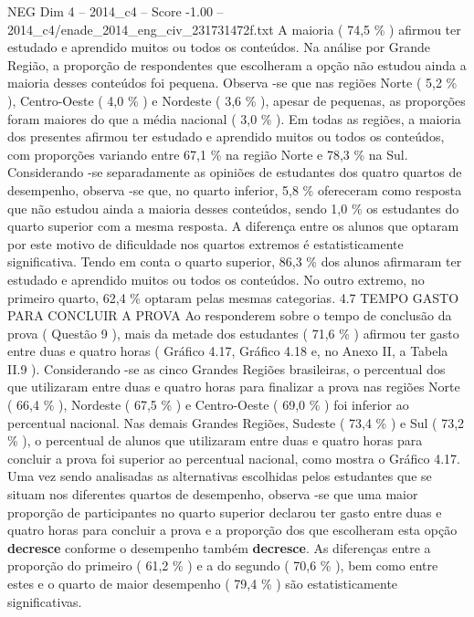 \begin{textsample}{NEG Dim 4 – 2014\_c4 – Score -1.00 – 2014\_c4/enade\_2014\_eng\_civ\_231731472f.txt}
A maioria ( 74,5 \% ) afirmou ter estudado e aprendido muitos ou todos os conteúdos.
Na análise por Grande Região, a proporção de respondentes que escolheram a opção não estudou ainda a maioria desses conteúdos foi pequena.
Observa -se que nas regiões Norte ( 5,2 \% ), Centro-Oeste ( 4,0 \% ) e Nordeste ( 3,6 \% ), apesar de pequenas, as proporções foram maiores do que a média nacional ( 3,0 \% ).
Em todas as regiões, a maioria dos presentes afirmou ter estudado e aprendido muitos ou todos os conteúdos, com proporções variando entre 67,1 \% na região Norte e 78,3 \% na Sul.
Considerando -se separadamente as opiniões de estudantes dos quatro quartos de desempenho, observa -se que, no quarto inferior, 5,8 \% ofereceram como resposta que não estudou ainda a maioria desses conteúdos, sendo 1,0 \% os estudantes do quarto superior com a mesma resposta.
A diferença entre os alunos que optaram por este motivo de dificuldade nos quartos extremos é estatisticamente significativa.
Tendo em conta o quarto superior, 86,3 \% dos alunos afirmaram ter estudado e aprendido muitos ou todos os conteúdos.
No outro extremo, no primeiro quarto, 62,4 \% optaram pelas mesmas categorias. 4.7 TEMPO GASTO PARA CONCLUIR A PROVA Ao responderem sobre o tempo de conclusão da prova ( Questão 9 ), mais da metade dos estudantes ( 71,6 \% ) afirmou ter gasto entre duas e quatro horas ( Gráfico 4.17, Gráfico 4.18 e, no Anexo II, a Tabela II.9 ).
Considerando -se as cinco Grandes Regiões brasileiras, o percentual dos que utilizaram entre duas e quatro horas para finalizar a prova nas regiões Norte ( 66,4 \% ), Nordeste ( 67,5 \% ) e Centro-Oeste ( 69,0 \% ) foi inferior ao percentual nacional.
Nas demais Grandes Regiões, Sudeste ( 73,4 \% ) e Sul ( 73,2 \% ), o percentual de alunos que utilizaram entre duas e quatro horas para concluir a prova foi superior ao percentual nacional, como mostra o Gráfico 4.17.
Uma vez sendo analisadas as alternativas escolhidas pelos estudantes que se situam nos diferentes quartos de desempenho, observa -se que uma maior proporção de participantes no quarto superior declarou ter gasto entre duas e quatro horas para concluir a prova e a proporção dos que escolheram esta opção \textbf{decresce} conforme o desempenho também \textbf{decresce}.
As diferenças entre a proporção do primeiro ( 61,2 \% ) e a do segundo ( 70,6 \% ), bem como entre estes e o quarto de maior desempenho ( 79,4 \% ) são estatisticamente significativas.

\end{textsample}
